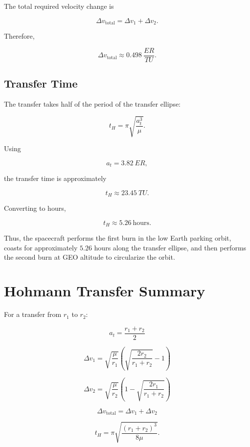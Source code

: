 \documentclass{article}
\begin{document}
The total required velocity change is

\[
\Delta v_{\text{total}}
=
\Delta v_1+\Delta v_2.
\]

Therefore,

\[
\boxed{
\Delta v_{\text{total}}
\approx
0.498~\frac{ER}{TU}
}.
\]


\subsection{Transfer Time}

The transfer takes half of the period of the transfer ellipse:

\[
t_H
=
\pi
\sqrt{
\frac{a_t^3}{\mu}
}.
\]

Using

\[
a_t=3.82~ER,
\]

the transfer time is approximately

\[
t_H
\approx
23.45~TU.
\]

Converting to hours,

\[
\boxed{
t_H
\approx
5.26~\text{hours}
}.
\]

Thus, the spacecraft performs the first burn in the low Earth parking orbit, coasts for approximately \(5.26\) hours along the transfer ellipse, and then performs the second burn at GEO altitude to circularize the orbit.


\section{Hohmann Transfer Summary}

For a transfer from \(r_1\) to \(r_2\):

\[
\boxed{
a_t
=
\frac{r_1+r_2}{2}
}
\]

\[
\boxed{
\Delta v_1
=
\sqrt{\frac{\mu}{r_1}}
\left(
\sqrt{\frac{2r_2}{r_1+r_2}}
-
1
\right)
}
\]

\[
\boxed{
\Delta v_2
=
\sqrt{\frac{\mu}{r_2}}
\left(
1-
\sqrt{\frac{2r_1}{r_1+r_2}}
\right)
}
\]

\[
\boxed{
\Delta v_{\text{total}}
=
\Delta v_1+\Delta v_2
}
\]

\[
\boxed{
t_H
=
\pi
\sqrt{
\frac{(r_1+r_2)^3}{8\mu}
}
}.
\]
\end{document}
